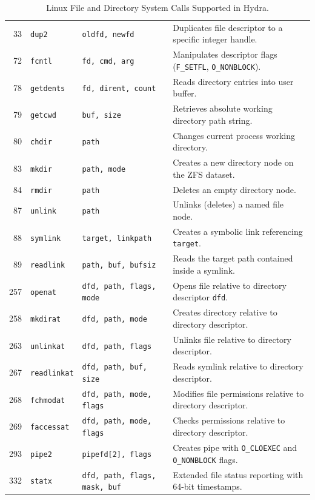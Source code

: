 \begin{table}[htbp]
\begin{tabularx}{\textwidth}{rllX}
33 & \texttt{dup2} & \texttt{oldfd, newfd} & Duplicates file descriptor to a specific integer handle. \\
72 & \texttt{fcntl} & \texttt{fd, cmd, arg} & Manipulates descriptor flags (\texttt{F\_SETFL}, \texttt{O\_NONBLOCK}). \\
78 & \texttt{getdents} & \texttt{fd, dirent, count} & Reads directory entries into user buffer. \\
79 & \texttt{getcwd} & \texttt{buf, size} & Retrieves absolute working directory path string. \\
80 & \texttt{chdir} & \texttt{path} & Changes current process working directory. \\
83 & \texttt{mkdir} & \texttt{path, mode} & Creates a new directory node on the ZFS dataset. \\
84 & \texttt{rmdir} & \texttt{path} & Deletes an empty directory node. \\
87 & \texttt{unlink} & \texttt{path} & Unlinks (deletes) a named file node. \\
88 & \texttt{symlink} & \texttt{target, linkpath} & Creates a symbolic link referencing \texttt{target}. \\
89 & \texttt{readlink} & \texttt{path, buf, bufsiz} & Reads the target path contained inside a symlink. \\
257 & \texttt{openat} & \texttt{dfd, path, flags, mode} & Opens file relative to directory descriptor \texttt{dfd}. \\
258 & \texttt{mkdirat} & \texttt{dfd, path, mode} & Creates directory relative to directory descriptor. \\
263 & \texttt{unlinkat} & \texttt{dfd, path, flags} & Unlinks file relative to directory descriptor. \\
267 & \texttt{readlinkat}& \texttt{dfd, path, buf, size} & Reads symlink relative to directory descriptor. \\
268 & \texttt{fchmodat} & \texttt{dfd, path, mode, flags} & Modifies file permissions relative to directory descriptor. \\
269 & \texttt{faccessat}& \texttt{dfd, path, mode, flags} & Checks permissions relative to directory descriptor. \\
293 & \texttt{pipe2} & \texttt{pipefd[2], flags} & Creates pipe with \texttt{O\_CLOEXEC} and \texttt{O\_NONBLOCK} flags. \\
332 & \texttt{statx} & \texttt{dfd, path, flags, mask, buf} & Extended file status reporting with 64-bit timestamps. \\
\bottomrule
\end{tabularx}
\caption{Linux File and Directory System Calls Supported in Hydra.}
\label{tab:syscall_file}
\end{table}

